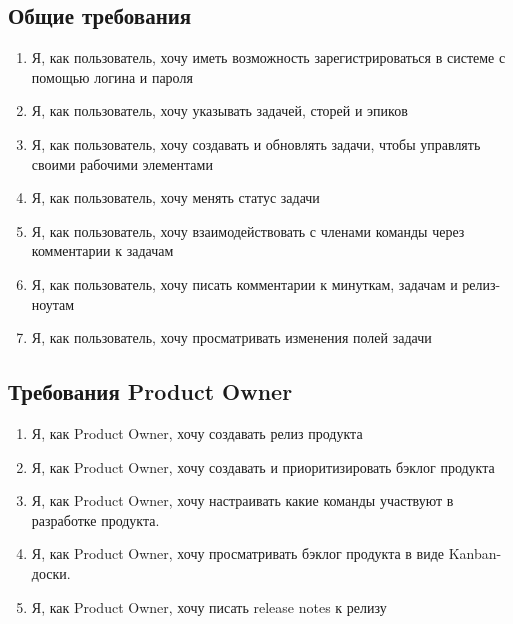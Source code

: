 \documentclass[14pt,a4paper]{extarticle}
\begin{document}
\subsection{Общие требования}
\begin{enumerate}[label=\textbf{FR\arabic*}.]
	\item Я, как пользователь, хочу иметь возможность зарегистрироваться в системе с помощью логина и пароля
	\item Я, как пользователь, хочу указывать  задачей, сторей и эпиков
	\item Я, как пользователь, хочу создавать и обновлять задачи, чтобы управлять своими рабочими элементами
	\item Я, как пользователь, хочу менять статус задачи
	\item Я, как пользователь, хочу взаимодействовать с членами команды через
	      комментарии к задачам
	\item Я, как пользователь, хочу писать комментарии к минуткам, задачам и релиз-ноутам
	\item Я, как пользователь, хочу просматривать изменения полей задачи
\end{enumerate}

\subsection{Требования Product Owner}
\begin{enumerate}[label=\textbf{POR\arabic*}.]
	\item Я, как Product Owner, хочу создавать релиз продукта
	\item Я, как Product Owner, хочу создавать и приоритизировать бэклог продукта
	\item Я, как Product Owner, хочу настраивать какие команды участвуют в разработке продукта.
	\item Я, как Product Owner, хочу просматривать бэклог продукта в виде Kanban-доски.
	\item Я, как Product Owner, хочу писать release notes к релизу
\end{enumerate}
\end{document}
